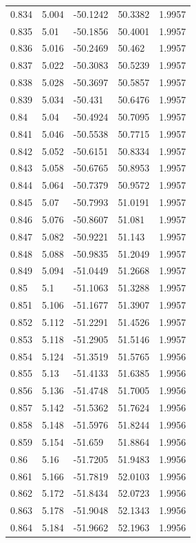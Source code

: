 \begin{tabular}{lllll}
0.834 & 5.004 & -50.1242 & 50.3382 & 1.9957 \\
0.835 & 5.01 & -50.1856 & 50.4001 & 1.9957 \\
0.836 & 5.016 & -50.2469 & 50.462 & 1.9957 \\
0.837 & 5.022 & -50.3083 & 50.5239 & 1.9957 \\
0.838 & 5.028 & -50.3697 & 50.5857 & 1.9957 \\
0.839 & 5.034 & -50.431 & 50.6476 & 1.9957 \\
0.84 & 5.04 & -50.4924 & 50.7095 & 1.9957 \\
0.841 & 5.046 & -50.5538 & 50.7715 & 1.9957 \\
0.842 & 5.052 & -50.6151 & 50.8334 & 1.9957 \\
0.843 & 5.058 & -50.6765 & 50.8953 & 1.9957 \\
0.844 & 5.064 & -50.7379 & 50.9572 & 1.9957 \\
0.845 & 5.07 & -50.7993 & 51.0191 & 1.9957 \\
0.846 & 5.076 & -50.8607 & 51.081 & 1.9957 \\
0.847 & 5.082 & -50.9221 & 51.143 & 1.9957 \\
0.848 & 5.088 & -50.9835 & 51.2049 & 1.9957 \\
0.849 & 5.094 & -51.0449 & 51.2668 & 1.9957 \\
0.85 & 5.1 & -51.1063 & 51.3288 & 1.9957 \\
0.851 & 5.106 & -51.1677 & 51.3907 & 1.9957 \\
0.852 & 5.112 & -51.2291 & 51.4526 & 1.9957 \\
0.853 & 5.118 & -51.2905 & 51.5146 & 1.9957 \\
0.854 & 5.124 & -51.3519 & 51.5765 & 1.9956 \\
0.855 & 5.13 & -51.4133 & 51.6385 & 1.9956 \\
0.856 & 5.136 & -51.4748 & 51.7005 & 1.9956 \\
0.857 & 5.142 & -51.5362 & 51.7624 & 1.9956 \\
0.858 & 5.148 & -51.5976 & 51.8244 & 1.9956 \\
0.859 & 5.154 & -51.659 & 51.8864 & 1.9956 \\
0.86 & 5.16 & -51.7205 & 51.9483 & 1.9956 \\
0.861 & 5.166 & -51.7819 & 52.0103 & 1.9956 \\
0.862 & 5.172 & -51.8434 & 52.0723 & 1.9956 \\
0.863 & 5.178 & -51.9048 & 52.1343 & 1.9956 \\
0.864 & 5.184 & -51.9662 & 52.1963 & 1.9956 \\

\end{tabular}
